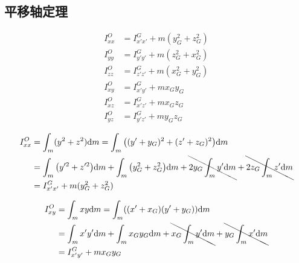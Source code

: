 \subsection{平移轴定理}
\begin{equation}
  \begin{split}
    I^O_{xx}&=I^G_{x'x'}+m(y^2_G+z^2_G)\\
    I^O_{yy}&=I^G_{y'y'}+m(z^2_G+x^2_G)\\
    I^O_{zz}&=I^G_{z'z'}+m(x^2_G+y^2_G)\\
    I^O_{xy}&=I^G_{x'y'}+mx_Gy_G\\
    I^O_{xz}&=I^G_{x'z'}+mx_Gz_G\\
    I^O_{yz}&=I^G_{y'z'}+my_Gz_G
  \end{split}
\end{equation}

\begin{equation}
  \begin{split}
    I^O_{xx}&=\int_m(y^2+z^2)\mathrm{d}m=\int_m\qty((y'+y_G)^2+(z'+z_G)^2)\mathrm{d}m\\
    &=\int_m\qty(y'^2+z'^2)\mathrm{d}m+\int_m\qty(y_G^2+z_G^2)\mathrm{d}m+\bcancel{2y_G\int_my'\mathrm{d}m}+\bcancel{2z_G\int_mz'\mathrm{d}m}\\
    &=I^G_{x'x'}+m(y_G^2+z_G^2)
  \end{split}
\end{equation}

\begin{equation}
  \begin{split}
    I^O_{xy}&=\int_mxy\mathrm{d}m=\int_m((x'+x_G)(y'+y_G))\mathrm{d}m\\
    &=\int_mx'y'\mathrm{d}m+\int_mx_Gy_G\mathrm{d}m+\bcancel{x_G\int_my'\mathrm{d}m}+\bcancel{y_G\int_mx'\mathrm{d}m}\\
    &=I^G_{x'y'}+mx_Gy_G
  \end{split}
\end{equation}
